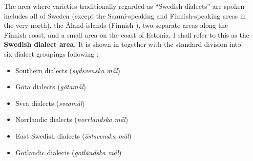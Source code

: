The area where varieties traditionally regarded as “Swedish dialects” are spoken includes all of Sweden (except the Saami-speaking and Finnish-speaking areas in the very north), the Åland islands (Finnish ), two separate areas along the Finnish coast, and a small area on the coast of Estonia. I shall refer to this as the \textbf{Swedish dialect area.} It is shown in  together with the standard division into six dialect groupings following \citet[II:170]{Wessén1966}: 

\begin{itemize}
\item 

Southern dialects (\textit{sydsvenska mål})


\item 

Göta dialects (\textit{götamål})


\item 

Svea dialects (\textit{sveamål})


\item 

Norrlandic dialects (\textit{norrländska mål})


\item 

East Swedish dialects (\textit{östsvenska mål})


\item 

Gotlandic dialects (\textit{gotländska mål})


\end{itemize}


